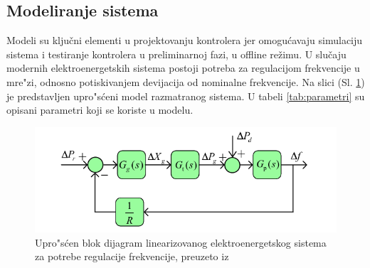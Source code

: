 \documentclass[a4paper,11pt]{article}
\theoremstyle{definition} \newtheorem{deff}{Definicija}[section]
\theoremstyle{definition} \newtheorem{prim}[deff]{Primer}
\theoremstyle{plain} \newtheorem{teor}[deff]{Teorema}
\begin{document}
	
	
	\newpage
	
	\subsection{Modeliranje sistema}\label{sec:modeliranje}
	
	Modeli su ključni elementi u projektovanju kontrolera jer omogućavaju simulaciju sistema i testiranje kontrolera u preliminarnoj fazi, u offline režimu. U slučaju modernih elektroenergetskih sistema postoji potreba za regulacijom frekvencije u mre"zi, odnosno potiskivanjem devijacija od nominalne frekvencije. 
	Na slici (Sl. \ref{fig:lin_model}) je predstavljen upro"s\'ceni model razmatranog sistema. U tabeli \ref{tab:parametri} su opisani parametri koji se koriste u modelu. \cite{inicijalna}\\
	
	
	\begin{figure}[!htb]
		\centering
		\includegraphics[width=\linewidth]{slike/lin_model.png}
		
		\caption{Upro"s\'cen blok dijagram linearizovanog elektroenergetskog sistema za potrebe regulacije frekvencije, preuzeto iz \cite{inicijalna} \label{fig:lin_model}}
	\end{figure}
	
	
	
\end{document}
